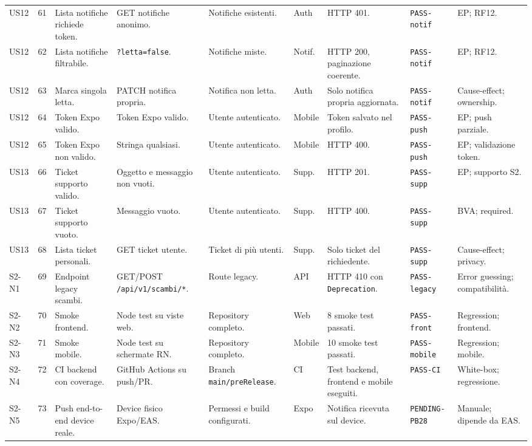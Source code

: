 \documentclass[11pt,a4paper]{article}
\newcommand{\code}[1]{\texttt{#1}}
\begin{document}
\begin{longtable}{L{1.2cm}C{0.45cm}L{2.35cm}L{2.05cm}L{1.95cm}L{0.9cm}L{2.3cm}L{1.55cm}L{2.05cm}}
US12 & 61 & Lista notifiche richiede token. & GET notifiche anonimo. & Notifiche esistenti. & Auth & HTTP 401. & \code{PASS-notif} & EP; RF12. \\
US12 & 62 & Lista notifiche filtrabile. & \code{?letta=false}. & Notifiche miste. & Notif. & HTTP 200, paginazione coerente. & \code{PASS-notif} & EP; RF12. \\
US12 & 63 & Marca singola letta. & PATCH notifica propria. & Notifica non letta. & Auth & Solo notifica propria aggiornata. & \code{PASS-notif} & Cause-effect; ownership. \\
US12 & 64 & Token Expo valido. & Token Expo valido. & Utente autenticato. & Mobile & Token salvato nel profilo. & \code{PASS-push} & EP; push parziale. \\
US12 & 65 & Token Expo non valido. & Stringa qualsiasi. & Utente autenticato. & Mobile & HTTP 400. & \code{PASS-push} & EP; validazione token. \\

US13 & 66 & Ticket supporto valido. & Oggetto e messaggio non vuoti. & Utente autenticato. & Supp. & HTTP 201. & \code{PASS-supp} & EP; supporto S2. \\
US13 & 67 & Ticket supporto vuoto. & Messaggio vuoto. & Utente autenticato. & Supp. & HTTP 400. & \code{PASS-supp} & BVA; required. \\
US13 & 68 & Lista ticket personali. & GET ticket utente. & Ticket di più utenti. & Supp. & Solo ticket del richiedente. & \code{PASS-supp} & Cause-effect; privacy. \\

S2-N1 & 69 & Endpoint legacy scambi. & GET/POST \code{/api/v1/scambi/*}. & Route legacy. & API & HTTP 410 con \code{Deprecation}. & \code{PASS-legacy} & Error guessing; compatibilità. \\
S2-N2 & 70 & Smoke frontend. & Node test su viste web. & Repository completo. & Web & 8 smoke test passati. & \code{PASS-front} & Regression; frontend. \\
S2-N3 & 71 & Smoke mobile. & Node test su schermate RN. & Repository completo. & Mobile & 10 smoke test passati. & \code{PASS-mobile} & Regression; mobile. \\
S2-N4 & 72 & CI backend con coverage. & GitHub Actions su push/PR. & Branch \code{main/preRelease}. & CI & Test backend, frontend e mobile eseguiti. & \code{PASS-CI} & White-box; regressione. \\
S2-N5 & 73 & Push end-to-end device reale. & Device fisico Expo/EAS. & Permessi e build configurati. & Expo & Notifica ricevuta sul device. & \code{PENDING-PB28} & Manuale; dipende da EAS. \\

\end{longtable}
\setlength\tabcolsep{6pt}
\renewcommand{\arraystretch}{1}
\normalsize
\end{document}
